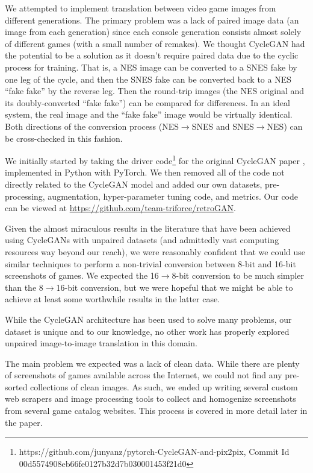 \documentclass[10pt,twocolumn,letterpaper]{article}
\begin{document}
We attempted to implement translation between video game images from different generations. The primary problem was a lack of paired image data (an image from each generation) since each console generation consists almost solely of different games (with a small number of remakes). We thought CycleGAN had the potential to be a solution as it doesn't require paired data due to the cyclic process for training. That is, a NES image can be converted to a SNES fake by one leg of the cycle, and then the SNES fake can be converted back to a NES ``fake fake'' by the reverse leg. Then the round-trip images (the NES original and its doubly-converted ``fake fake'') can be compared for differences. In an ideal system, the real image and the ``fake fake'' image would be virtually identical. Both directions of the conversion process (NES$\rightarrow$SNES and SNES$\rightarrow$NES) can be cross-checked in this fashion.

We initially started by taking the driver code\footnote{https://github.com/junyanz/pytorch-CycleGAN-and-pix2pix, Commit Id 00d5574908eb66fe0127b32d7b030001453f21d0} for the original CycleGAN paper \cite{CycleGAN}, implemented in Python with PyTorch. We then removed all of the code not directly related to the CycleGAN model and added our own datasets, pre-processing, augmentation, hyper-parameter tuning code, and metrics. Our code can be viewed at \url{https://github.com/team-triforce/retroGAN}.

Given the almost miraculous results in the literature that have been achieved using CycleGANs with unpaired datasets (and admittedly vast computing resources way beyond our reach), we were reasonably confident that we could use similar techniques to perform a non-trivial conversion between 8-bit and 16-bit screenshots of games. We expected the 16$\rightarrow$8-bit conversion to be much simpler than the 8$\rightarrow$16-bit conversion, but we were hopeful that we might be able to achieve at least some worthwhile results in the latter case.

While the CycleGAN architecture has been used to solve many problems, our dataset is unique and to our knowledge, no other work has properly explored unpaired image-to-image translation in this domain.


The main problem we expected was a lack of clean data. While there are plenty of screenshots of games available across the Internet, we could not find any pre-sorted collections of clean images. As such, we ended up writing several custom web scrapers and image processing tools to collect and homogenize screenshots from several game catalog websites. This process is covered in more detail later in the paper.
\end{document}
